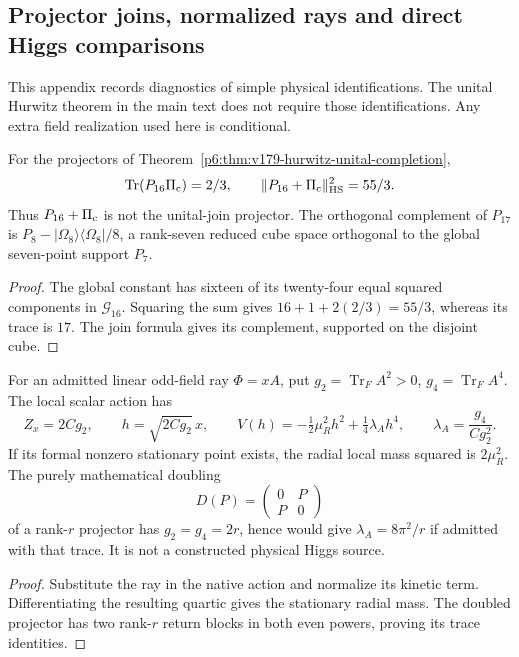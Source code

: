\documentclass[11pt,a4paper]{article}
\begin{document}
\subsection{Projector joins, normalized rays and direct Higgs comparisons}
\label{p6:app:v179-projector-diagnostics}

This appendix records diagnostics of simple physical identifications.
The unital Hurwitz theorem in the main text does not require those
identifications.  Any extra field realization used here is conditional.

\begin{proposition}
\label{p6:prop:v179-join-sum-diagnostic}
For the projectors of
Theorem~\ref{p6:thm:v179-hurwitz-unital-completion},
\[
 \operatorname{Tr}(P_{16}\Pi_{\rm c})=2/3,\qquad
 \|P_{16}+\Pi_{\rm c}\|_{\rm HS}^2=55/3.
\]
Thus \(P_{16}+\Pi_{\rm c}\) is not the unital-join projector.
The orthogonal complement of \(P_{17}\) is
\(P_8-|\Omega_8\rangle\langle\Omega_8|/8\), a rank-seven reduced cube
space orthogonal to the global seven-point support \(P_7\).
\end{proposition}
\begin{proof}
The global constant has sixteen of its twenty-four equal squared
components in \(\mathcal G_{16}\).  Squaring the sum gives
\(16+1+2(2/3)=55/3\), whereas its trace is \(17\).
The join formula gives its complement, supported on the disjoint cube.
\end{proof}

\begin{proposition}
\label{p6:prop:v179-flat-projector-higgs-test}
For an admitted linear odd-field ray \(\Phi=xA\), put
\(g_2=\operatorname{Tr}_F A^2>0\), \(g_4=\operatorname{Tr}_F A^4\).
The local scalar action has
\[
 Z_x=2Cg_2,\qquad h=\sqrt{2Cg_2}\,x,\qquad
 V(h)=-\tfrac12\mu_R^2h^2+\tfrac14\lambda_Ah^4,\qquad
 \lambda_A=\frac{g_4}{Cg_2^2}.
\]
If its formal nonzero stationary point exists, the radial local mass
squared is \(2\mu_R^2\).
The purely mathematical doubling
\[
 D(P)=\begin{pmatrix}0&P\\P&0\end{pmatrix}
\]
of a rank-\(r\) projector has \(g_2=g_4=2r\), hence would give
\(\lambda_A=8\pi^2/r\) if admitted with that trace.
It is not a constructed physical Higgs source.
\end{proposition}
\begin{proof}
Substitute the ray in the native action and normalize its kinetic term.
Differentiating the resulting quartic gives the stationary radial mass.
The doubled projector has two rank-\(r\) return blocks in both even
powers, proving its trace identities.
\end{proof}
\end{document}
